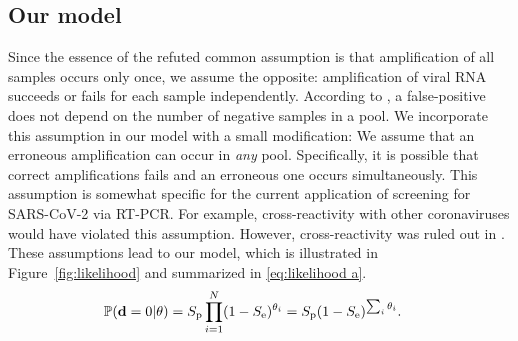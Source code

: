 \documentclass{article}
\begin{document}
\subsection*{Our model}\label{subsec:ours}
Since the essence of the refuted common assumption is that
amplification of all samples occurs only once, we assume the opposite:
amplification of viral RNA succeeds or fails for each sample
independently. According to \cite{Simplistic1, Simplistic2, Kim,
  OptimalDorfmanPool}, a false-positive does not
depend on the number of negative samples in a pool. We incorporate
this assumption in our model with a small modification: We assume that
an erroneous amplification can occur in \emph{any} pool. Specifically,
it is possible that correct amplifications fails and an erroneous one
occurs simultaneously. This assumption is somewhat specific for the
current application of screening for SARS-CoV-2 via RT-PCR. For
example, cross-reactivity with other coronaviruses would have violated
this assumption. However, cross-reactivity was ruled out in
\cite{KitComparison}.
These assumptions lead to our model, which is illustrated in 
Figure~\ref{fig:likelihood} and summarized in
\eqref{eq:likelihood a}.%
\begin{align}%
    \Pr(\data=0 | \theta) &= \spec\prod_{i=1}^N
    (1-\sens)^{\theta_i} = \spec(1-\Se)^{\sum_i\theta_i}. \label{eq:likelihood a}
\end{align}
\end{document}

